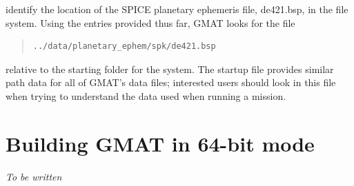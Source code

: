 \documentclass[letterpaper,10pt]{article}%
\begin{document}
\noindent identify the location of the SPICE planetary ephemeris file, de421.bsp, in the file system.  Using the entries provided thus far, GMAT looks for the file

\begin{quote}
\begin{verbatim}
../data/planetary_ephem/spk/de421.bsp
\end{verbatim}
\end{quote}

\noindent relative to the starting folder for the system.  The startup file provides similar path data for all of GMAT's data files; interested users should look in this file when trying to understand the data used when running a mission.

\section{\label{app:64bit}Building GMAT in 64-bit mode}

\textit{To be written}
\end{document}
